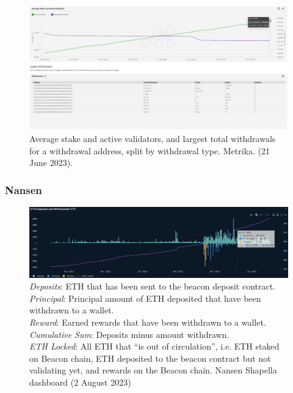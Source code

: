 \documentclass[UTF8]{article}
\begin{document}
{\begin{figure}[htbp]
\begin{center}
\includegraphics[width=0.9\linewidth]{images/metrika6}
\caption{Average stake and active validators, and largest total withdrawals for a withdrawal address, split by withdrawal type.  Metrika. (21 June 2023). }
\label{fig:metrika6}
\end{center}
\end{figure}

\clearpage

\subsubsection*{Nansen}
\begin{figure}[htbp]
\begin{center}
\includegraphics[width=\linewidth]{images/nansen1}
\caption{\textit{Deposits}: ETH that has been sent to the beacon deposit contract.\\
\textit{Principal}: Principal amount of ETH deposited that have been withdrawn to a wallet.\\
\textit{Reward}: Earned rewards that have been withdrawn to a wallet.\\
\textit{Cumulative Sum}: Deposits minus amount withdrawn.\\
\textit{ETH Locked}: All ETH that ``is out of circulation'', i.e. ETH staked on Beacon chain, ETH deposited to the beacon contract but not validating yet, and
rewards on the Beacon chain. Nansen Shapella dashboard (2 August 2023)}
\label{fig:nansen1}
\end{center}
\end{figure}

}
\end{document}
